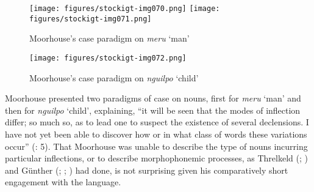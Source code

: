 \begin{figure}[t]
\texttt{[image: figures/stockigt-img070.png]}
\texttt{[image: figures/stockigt-img071.png]}
\caption{Moorhouse’s case paradigm on \textit{meru} `man' \citeyearpar[3--4]{moorhouse_vocabulary_1846}}
\label{fig:key:124}
\end{figure}

\begin{figure}[t]
\texttt{[image: figures/stockigt-img072.png]}
\caption{Moorhouse’s case paradigm on \textit{nguilpo} `child' \citeyearpar[4]{moorhouse_vocabulary_1846}}
\label{fig:key:126}
\end{figure}



\begin{table}
\caption{Case forms and functions given by Moorhouse on nouns}
\label{tab:key:125}
\end{table}

Moorhouse presented two paradigms of case on nouns, first for \textit{meru} `man' and then for \textit{nguilpo} `child', explaining, “it will be seen that the modes of inflection differ; so much so, as to lead one to suspect the existence of several declensions. I have not yet been able to discover how or in what class of words these variations occur” (\citeyear{moorhouse_vocabulary_1846}: 5). That Moorhouse was unable to describe the type of nouns incurring particular inflections, or to describe morphophonemic processes, as Threlkeld (\citeyear{threlkeld_australian_1834}; ) and Günther (\citeyear{gunther_native_1838}; \citeyear{gunther_lecture_1840}; ) had done, is not surprising given his comparatively short engagement with the language.


